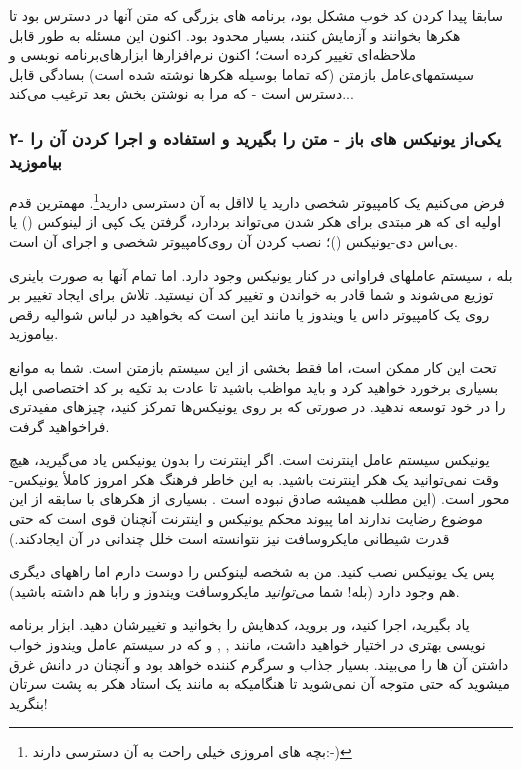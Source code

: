 سابقا پیدا کردن کد خوب مشکل بود، برنامه های بزرگی که متن آنها در دسترس بود تا هکرها بخوانند و آزمایش کنند، بسیار محدود بود. اکنون این مسئله به طور قابل ملاحظه‌ای تغییر کرده است؛ اکنون نرم‌افزارها ابزارهای‌برنامه نوبسی و سیستمهای‌عامل بازمتن (که تماما بوسیله هکرها نوشته شده است) بسادگی قابل دسترس است - که مرا به نوشتن بخش بعد ترغیب می‌کند...
\subsubsection*{۲- یکی‌از یونیکس های ‌باز - متن را بگیرید و استفاده و اجرا کردن آن را بیاموزید}
فرض می‌کنیم یک کامپیوتر شخصی دارید یا لااقل به آن دسترسی دارید\footnote{بچه های امروزی خیلی راحت به آن دسترسی دارند:-)}. مهمترین قدم اولیه ای که هر مبتدی برای هکر شدن می‌تواند بردارد، گرفتن یک کپی از لینوکس () یا بی‌اس دی-یونیکس ()؛ نصب کردن آن روی‌کامپیوتر شخصی و اجرای آن است.

بله ، سیستم عاملهای فراوانی در کنار یونیکس وجود دارد. اما تمام آنها به صورت باینری توزیع می‌شوند و شما قادر به خواندن و تغییر کد آن نیستید. تلاش برای ایجاد تغییر بر روی یک کامپیوتر داس یا ویندوز یا 
 مانند این است که بخواهید در لباس شوالیه رقص بیاموزید.
 
تحت 
 این کار ممکن است، اما فقط بخشی از این سیستم بازمتن است. شما به موانع بسیاری برخورد خواهید کرد و باید مواظب باشید تا عادت بد تکیه بر کد اختصاصی اپل را در خود توسعه ندهید. در صورتی که بر روی یونیکس‌ها تمرکز کنید، چیزهای مفیدتری فراخواهید گرفت.

یونیکس سیستم عامل اینترنت است. اگر اینترنت را بدون یونیکس یاد می‌گیرید، هیچ وقت نمی‌توانید یک هکر اینترنت باشید. به این خاطر فرهنگ هکر امروز کاملأ یونیکس-محور است. (این مطلب همیشه صادق نبوده است . بسیاری از هکرهای با سابقه از این موضوع رضایت ندارند اما پیوند محکم یونیکس و اینترنت آنچنان قوی است که حتی قدرت شیطانی مایکروسافت نیز نتوانسته است خلل چندانی در آن ایجادکند.)

پس یک یونیکس نصب کنید. من به شخصه لینوکس را دوست دارم اما راههای دیگری هم وجود دارد (بله! شما
\emph{می‌توانید}
مایکروسافت ویندوز و 
 رابا هم داشته باشید).
 
 یاد بگیرید، اجرا کنید، ور بروید، کدهایش را بخوانید و تغییرشان دهید. ابزار برنامه نویسی بهتری در اختیار خواهید داشت، مانند , 
, 
 و 
 که در سیستم عامل ویندوز خواب داشتن آن ها را می‌بیند. بسیار جذاب و سرگرم کننده خواهد بود و آنچنان در دانش غرق میشوید که حتی متوجه آن نمی‌شوید تا هنگامیکه به مانند یک استاد هکر به پشت سرتان بنگرید!
 
